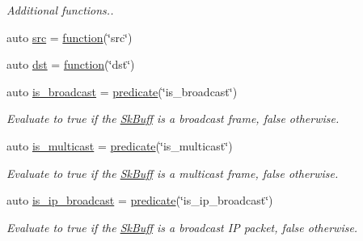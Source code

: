 \begin{DoxyCompactItemize}
\begin{DoxyCompactList}\small\item\em Additional functions.. \end{DoxyCompactList}\item 
auto \hyperlink{namespacepfq_1_1lang_1_1experimental_1_1anonymous__namespace_02experimental_8hpp_03_a9a26dd399154b70de7ed3da9015931fe}{src} = \hyperlink{namespacepfq_1_1lang_a1a4638059d700ae08d0ca63886ff2bb3}{function}(\char`\"{}src\char`\"{})
\item 
auto \hyperlink{namespacepfq_1_1lang_1_1experimental_1_1anonymous__namespace_02experimental_8hpp_03_a7b3e8ac44ecebbfd41420b39a269aeb9}{dst} = \hyperlink{namespacepfq_1_1lang_a1a4638059d700ae08d0ca63886ff2bb3}{function}(\char`\"{}dst\char`\"{})
\item 
auto \hyperlink{namespacepfq_1_1lang_1_1experimental_1_1anonymous__namespace_02experimental_8hpp_03_aa9e352437ab1621e226173bc1d900b96}{is\+\_\+broadcast} = \hyperlink{namespacepfq_1_1lang_aca9adafc436b7f851621b979fa1aaf88}{predicate}(\char`\"{}is\+\_\+broadcast\char`\"{})
\begin{DoxyCompactList}\small\item\em Evaluate to {\ttfamily true} if the \hyperlink{structpfq_1_1lang_1_1SkBuff}{Sk\+Buff} is a broadcast frame, {\ttfamily false} otherwise. \end{DoxyCompactList}\item 
auto \hyperlink{namespacepfq_1_1lang_1_1experimental_1_1anonymous__namespace_02experimental_8hpp_03_aaec1b91653bd79cedff8912605c7cdf8}{is\+\_\+multicast} = \hyperlink{namespacepfq_1_1lang_aca9adafc436b7f851621b979fa1aaf88}{predicate}(\char`\"{}is\+\_\+multicast\char`\"{})
\begin{DoxyCompactList}\small\item\em Evaluate to {\ttfamily true} if the \hyperlink{structpfq_1_1lang_1_1SkBuff}{Sk\+Buff} is a multicast frame, {\ttfamily false} otherwise. \end{DoxyCompactList}\item 
auto \hyperlink{namespacepfq_1_1lang_1_1experimental_1_1anonymous__namespace_02experimental_8hpp_03_a2d9128841747bf619fdf6ea411ee35e4}{is\+\_\+ip\+\_\+broadcast} = \hyperlink{namespacepfq_1_1lang_aca9adafc436b7f851621b979fa1aaf88}{predicate}(\char`\"{}is\+\_\+ip\+\_\+broadcast\char`\"{})
\begin{DoxyCompactList}\small\item\em Evaluate to {\ttfamily true} if the \hyperlink{structpfq_1_1lang_1_1SkBuff}{Sk\+Buff} is a broadcast IP packet, {\ttfamily false} otherwise. \end{DoxyCompactList}\item 

\end{DoxyCompactItemize}
